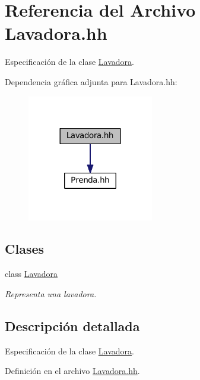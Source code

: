 \hypertarget{_lavadora_8hh}{\section{Referencia del Archivo Lavadora.\+hh}
\label{_lavadora_8hh}
}


Especificación de la clase \hyperlink{class_lavadora}{Lavadora}.  


Dependencia gráfica adjunta para Lavadora.\+hh\+:\nopagebreak
\begin{figure}[H]
\begin{center}
\leavevmode
\includegraphics[width=156pt]{_lavadora_8hh__incl}
\end{center}
\end{figure}
\subsection*{Clases}
\begin{DoxyCompactItemize}
\item 
class \hyperlink{class_lavadora}{Lavadora}
\begin{DoxyCompactList}\small\item\em Representa una lavadora. \end{DoxyCompactList}\end{DoxyCompactItemize}


\subsection{Descripción detallada}
Especificación de la clase \hyperlink{class_lavadora}{Lavadora}. 



Definición en el archivo \hyperlink{_lavadora_8hh_source}{Lavadora.\+hh}.

